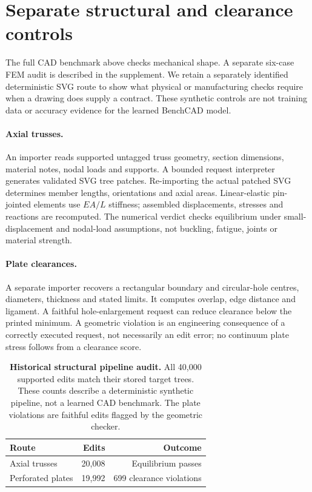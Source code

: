 \section{Separate structural and clearance controls}
\label{sec:structures}
The full CAD benchmark above checks mechanical shape. A separate six-case FEM audit is described in the supplement. We retain a separately identified deterministic SVG route to show what physical or manufacturing checks require when a drawing does supply a contract. These synthetic controls are not training data or accuracy evidence for the learned BenchCAD model.

\paragraph{Axial trusses.}
An importer reads supported untagged truss geometry, section dimensions, material notes, nodal loads and supports. A bounded request interpreter generates validated SVG tree patches. Re-importing the actual patched SVG determines member lengths, orientations and axial areas. Linear-elastic pin-jointed elements use $EA/L$ stiffness; assembled displacements, stresses and reactions are recomputed. The numerical verdict checks equilibrium under small-displacement and nodal-load assumptions, not buckling, fatigue, joints or material strength.

\paragraph{Plate clearances.}
A separate importer recovers a rectangular boundary and circular-hole centres, diameters, thickness and stated limits. It computes overlap, edge distance and ligament. A faithful hole-enlargement request can reduce clearance below the printed minimum. A geometric violation is an engineering consequence of a correctly executed request, not necessarily an edit error; no continuum plate stress follows from a clearance score.

\begin{table}[t]
\centering\footnotesize
\setlength{\tabcolsep}{3pt}
\begin{tabular}{@{}lrr@{}}
\toprule
Route & Edits & Outcome \\
\midrule
Axial trusses & 20,008 & Equilibrium passes \\
Perforated plates & 19,992 & 699 clearance violations \\
\bottomrule
\end{tabular}
\caption{\textbf{Historical structural pipeline audit.} All 40,000 supported edits match their stored target trees. These counts describe a deterministic synthetic pipeline, not a learned CAD benchmark. The plate violations are faithful edits flagged by the geometric checker.}
\label{tab:structural}
\end{table}

